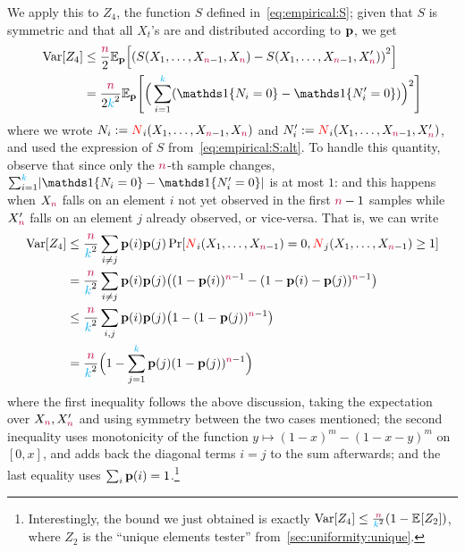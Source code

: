 We apply this to $Z_4$, \ie the function $S$ defined in~\cref{eq:empirical:S}; given that $S$ is symmetric and that all $X_t$'s are \iid and distributed according to $\mathbf{p}$, we get
\begin{align*}
  \Var[Z_4] 
  &\leq \frac{\ns}{2}  \bE{\p}{ \Paren{ S(X_1,\dots, X_{\ns-1}, X_\ns) - S(X_1,\dots, X_{\ns-1}, X'_\ns) }^2 } \\
  &= \frac{\ns}{2\ab^2} \bE{\p}{ \Big( \sum_{i=1}^\ab \Paren{ \indic{N_i = 0} - \indic{N_i' = 0} } \Big)^2 }
\end{align*}
where we wrote $N_i := \textcolor{red}{N}_i(X_1,\dots, X_{{\textcolor{purple}{n}}-1}, X_{\textcolor{purple}{n}})$ and $N_i' := \textcolor{red}{N}_i(X_1,\dots, X_{{\textcolor{purple}{n}}-1}, X'_{\textcolor{purple}{n}})$, and used the expression of $S$ from~\cref{eq:empirical:S:alt}. To handle this quantity, observe that since only the ${\textcolor{purple}{n}}$-th sample changes, $\sum_{i=1}^\ab \abs{  \indic{N_i = 0} - \indic{N_i' = 0}  }$ is at most $1$: and this happens when $X_{\textcolor{purple}{n}}$ falls on an element $i$ not yet observed in the first ${\textcolor{purple}{n}}-1$ samples while $X'_{\textcolor{purple}{n}}$ falls on an element $j$ already observed, or vice-versa. That is, we can write
\begin{align}
  \Var[Z_4] 
  &\leq  \frac{\ns}{\ab^2} \sum_{i\neq j} \p(i)\p(j) \bPr{\occur_i(X_1,\dots, X_{\ns-1})=0, \occur_j(X_1,\dots, X_{\ns-1}) \geq 1 } \notag\\
  &= \frac{\ns}{\ab^2} \sum_{i\neq j} \p(i)\p(j) \Paren{ (1-\p(i))^{\ns-1} - (1-\p(i)-\p(j))^{\ns-1} }\notag\\
  &\leq \frac{\ns}{\ab^2} \sum_{i, j} \p(i)\p(j) \Paren{ 1 - (1-\p(j))^{\ns-1} }\notag\\
  &= \frac{\ns}{\ab^2} \Big( 1 - \sum_{j=1}^\ab \p(j) (1-\p(j))^{\ns-1} \Big) \label{eq:empirical:var}
\end{align}
where the first inequality follows the above discussion, taking the expectation over $X_{\textcolor{purple}{n}},X'_{\textcolor{purple}{n}}$ and using symmetry between the two cases mentioned; the second inequality uses monotonicity of the function $y\mapsto (1-x)^m - (1-x-y)^m$ on $[0,x]$, and adds back the diagonal terms $i=j$ to the sum afterwards; and the last equality uses $\sum_i \mathbf{p}(i)=1$.\footnote{Interestingly, the bound we just obtained is exactly 
$
  \Var[Z_4] \leq \frac{\ns}{\ab^2} ( 1 - \bEE{Z_2} )
$, where $Z_2$ is the ``unique elements tester'' from~\cref{sec:uniformity:unique}.}

